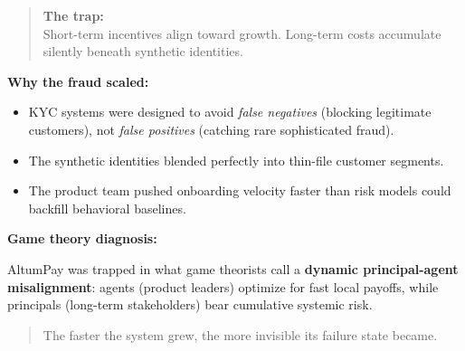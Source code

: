 \medskip

\begin{quote}
\textbf{The trap:} \\
Short-term incentives align toward growth. Long-term costs accumulate silently beneath synthetic identities.
\end{quote}

\medskip

\textbf{Why the fraud scaled:}

\begin{itemize}
  \item KYC systems were designed to avoid \emph{false negatives} (blocking legitimate customers), not \emph{false positives} (catching rare sophisticated fraud).
  \item The synthetic identities blended perfectly into thin-file customer segments.
  \item The product team pushed onboarding velocity faster than risk models could backfill behavioral baselines.
\end{itemize}

\medskip

\textbf{Game theory diagnosis:}

AltumPay was trapped in what game theorists call a \textbf{dynamic principal-agent misalignment}: agents (product leaders) optimize for fast local payoffs, while principals (long-term stakeholders) bear cumulative systemic risk.

\begin{quote}
The faster the system grew, the more invisible its failure state became.
\end{quote}

